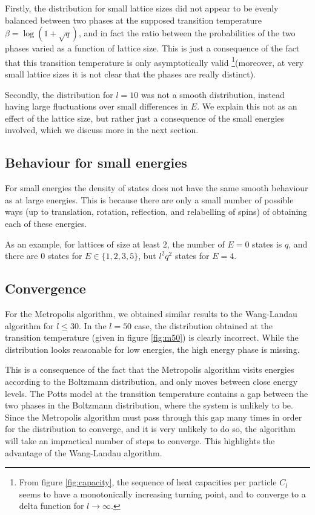 \documentclass{article}
\begin{document}
Firstly, the distribution for small lattice sizes did not appear to be evenly balanced between two phases at the supposed transition temperature $\beta = \log(1+\sqrt q)$, and in fact the ratio between the probabilities of the two phases varied as a function of lattice size.
This is just a consequence of the fact that this transition temperature is only asymptotically valid \footnote{From figure \ref{fig:capacity}, the sequence of heat capacities per particle $C_l$ seems to have a monotonically increasing turning point, and to converge to a delta function for $l \rightarrow \infty$.}(moreover, at very small lattice sizes it is not clear that the phases are really distinct).

Secondly, the distribution for $l = 10$ was not a smooth distribution, instead having large fluctuations over small differences in $E$.
We explain this not as an effect of the lattice size, but rather just a consequence of the small energies involved, which we discuss more in the next section.

\subsection{Behaviour for small energies}
For small energies the density of states does not have the same smooth behaviour as at large energies.
This is because there are only a small number of possible ways (up to translation, rotation, reflection, and relabelling of spins) of obtaining each of these energies.

As an example, for lattices of size at least 2, the number of $E = 0$ states is $q$, and there are $0$ states for $E \in \{1,2,3,5\}$, but $l^2q^2$ states for $E = 4$.

\subsection{Convergence}
For the Metropolis algorithm, we obtained similar results to the Wang-Landau algorithm for $l \leq 30$.
In the $l = 50$ case, the distribution obtained at the transition temperature (given in figure \ref{fig:m50}) is clearly incorrect.
While the distribution looks reasonable for low energies, the high energy phase is missing.

This is a consequence of the fact that the Metropolis algorithm visits energies according to the Boltzmann distribution, and only moves between close energy levels.
The Potts model at the transition temperature contains a gap between the two phases in the Boltzmann distribution, where the system is unlikely to be.
Since the Metropolis algorithm must pass through this gap many times in order for the distribution to converge, and it is very unlikely to do so, the algorithm will take an impractical number of steps to converge.
This highlights the advantage of the Wang-Landau algorithm.
\end{document}
